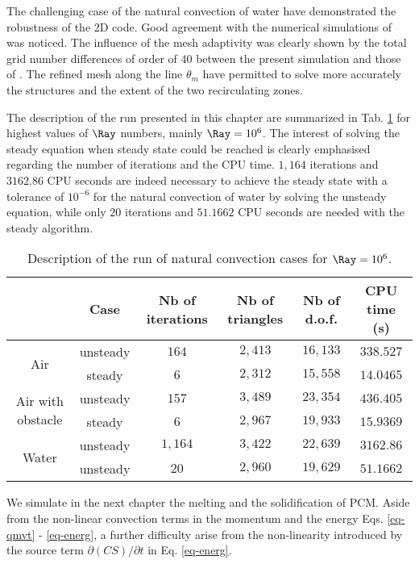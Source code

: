 \noindent The challenging case of the natural convection of water have demonstrated the robustness of the 2D code. 
Good agreement with the numerical simulations of \cite{Kowalewski-2003} was noticed. 
The influence of the mesh adaptivity was clearly shown by the total grid number differences of order of $40$ between the present simulation and those of \cite{Kowalewski-2003} .
The refined mesh along the line $\theta_m$ have permitted to solve more accurately the structures and the extent of the two recirculating zones.

The description of the run presented in this chapter are summarized in Tab. \ref{tab-natconv-cases} for highest values of $\Ray$ numbers, mainly $\Ray = 10^6$.
The interest of solving the steady equation when steady state could be reached is clearly emphasised regarding the number of iterations and the CPU time.
$1,164$ iterations and $3162.86$ CPU seconds are indeed necessary to achieve the steady state with a tolerance of $10^{-6}$ for the natural convection of water by solving the unsteady equation,
while only $20$ iterations and $51.1662$ CPU seconds are needed with the steady algorithm.

\begin{table}[!ht]
\centering
\begin{tabular}{*{6}{c}}
  & Case & {\small Nb of iterations} & {\small Nb of triangles} & {\small Nb of d.o.f.} & {\small CPU time (s)}   \\
  \toprule 
  \multirow{2}{*}{Air} & unsteady & $164$ & $2,413$ & $16,133$ & $338.527$ \\
   & steady & $6$ & $2,312$ & $15,558$ & $14.0465$ \\
  \hline
  \multirow{2}{*}{Air with obstacle} & unsteady & $157$ & $3,489$ & $23,354$ & $436.405$ \\
  & steady & $6$ & $2,967$ & $19,933$ & $15.9369$ \\
  \hline
  \multirow{2}{*}{Water} & unsteady & $1,164$ & $3,422$ & $22,639$ & $3162.86$ \\
   & unsteady & $20$ & $2,960$ & $19,629$ & $51.1662$ \\

\bottomrule
 \end{tabular}
\caption{Description of the run of natural convection cases for $\Ray = 10^6$.}
\label{tab-natconv-cases}
\end{table}

We simulate in the next chapter the melting and the solidification of PCM.
Aside from the non-linear convection terms in the momentum and the energy Eqs. \ref{eq-qmvt} - \ref{eq-energ}, a further difficulty arise from the non-linearity introduced by the source term $\partial (CS)/\partial t$ in Eq. \ref{eq-energ}.
